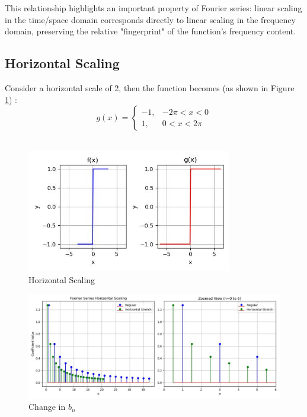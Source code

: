 \documentclass{article}
\begin{document}
This relationship highlights an important property of Fourier series: linear scaling in the time/space domain corresponds directly to linear scaling in the frequency domain, preserving the relative "fingerprint" of the function's frequency content.  

\subsection{Horizontal Scaling}
Consider a horizontal scale of 2, then the function becomes (as shown in Figure \ref{Horizontal_Scaling}) :
\begin{equation}
g(x) = 
\begin{cases} 
-1, & -2\pi < x < 0 \\
1, & 0 < x < 2\pi
\end{cases}
\end{equation}\\
\begin{figure}[t]
    \centering
    \includegraphics[width=0.8\textwidth]{horizontal_scaling.jpg}
    \caption{Horizontal Scaling}
    \label{Horizontal_Scaling}
\end{figure}
\begin{figure}[h]
    \centering
    \includegraphics[width=\textwidth]{horizontal_stem_stretch.jpg}
    \caption{Change in $b_n$}
    \label{fig:horizontal_stem_stretch}
\end{figure}
\end{document}
